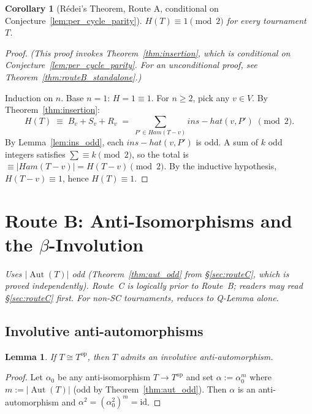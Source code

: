 \documentclass[12pt,reqno]{amsart}
\theoremstyle{plain}
\newtheorem{lemma}[theorem]{Lemma}
\newtheorem{corollary}[theorem]{Corollary}
\theoremstyle{definition}
\theoremstyle{remark}
\DeclareMathOperator{\Aut}{Aut}
\newcommand{\Ham}{\mathrm{Ham}}
\newcommand{\id}{\mathrm{id}}
\newcommand{\op}{\mathrm{op}}
\newcommand{\routeA}{\textcolor{axisteal}{\textbf{Route~A}}}
\newcommand{\inshat}{\widehat{\mathrm{ins}}}
\renewcommand{\Ham}{Ham}%
\renewcommand{\routeA}{Route A}%
\renewcommand{\inshat}{ins-hat}%
\begin{document}
\begin{corollary}[Rédei's Theorem, \routeA, conditional on Conjecture~\ref{lem:per_cycle_parity}]\label{cor:redei_A}
$H(T)\equiv 1\pmod{2}$ for every tournament $T$.
\end{corollary}
\begin{proof}
\emph{(This proof invokes Theorem~\ref{thm:insertion}, which is conditional on
Conjecture~\ref{lem:per_cycle_parity}. For an unconditional proof, see
Theorem~\ref{thm:routeB_standalone}.)}

Induction on $n$. Base $n=1$: $H=1\equiv1$. For $n\ge 2$, pick any $v\in V$.
By Theorem~\ref{thm:insertion}:
\[
  H(T) \;\equiv\; B_v + S_v + R_v
  \;=\; \sum_{P' \in \Ham(T{-}v)} \inshat(v, P') \;\pmod{2}.
\]
By Lemma~\ref{lem:ins_odd}, each $\inshat(v,P')$ is odd.
A sum of $k$ odd integers satisfies $\sum \equiv k \pmod{2}$, so the total is
$\equiv |\Ham(T{-}v)| = H(T{-}v) \pmod{2}$. By the inductive hypothesis,
$H(T{-}v)\equiv 1$, hence $H(T)\equiv 1$.
\end{proof}

\section{Route B: Anti-Isomorphisms and the $\beta$-Involution}
\label{sec:routeB}

\noindent\textit{Uses $|\Aut(T)|$ odd (Theorem~\ref{thm:aut_odd} from
\S\ref{sec:routeC}, which is proved independently). Route~C is logically
prior to Route~B; readers may read \S\ref{sec:routeC} first.
For non-SC tournaments, reduces to Q-Lemma alone.}

\subsection{Involutive anti-automorphisms}

\begin{lemma}\label{lem:involutive_alpha}
If $T\cong T^{\op}$, then $T$ admits an involutive anti-automorphism.
\end{lemma}
\begin{proof}
Let $\alpha_0$ be any anti-isomorphism $T\to T^{\op}$ and set $\alpha:=\alpha_0^m$
where $m:=|\Aut(T)|$ (odd by Theorem~\ref{thm:aut_odd}). Then $\alpha$ is an
anti-automorphism and $\alpha^2=(\alpha_0^2)^m=\id$.
\end{proof}
\end{document}
